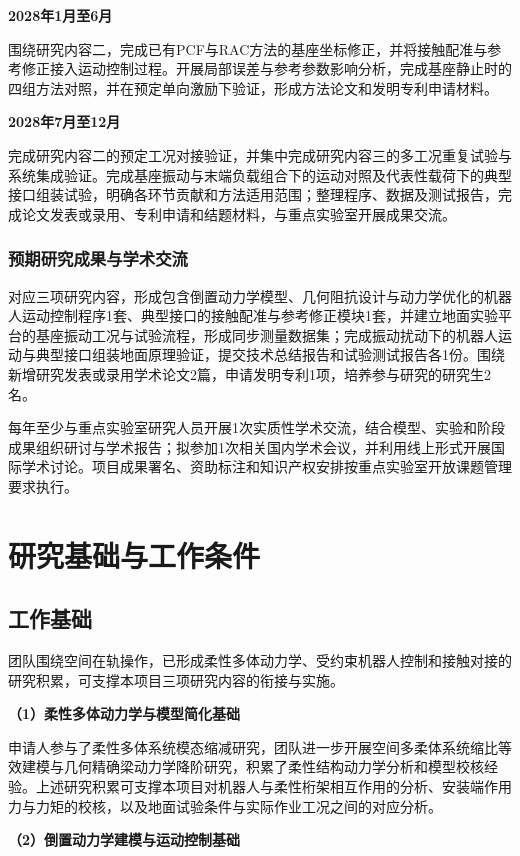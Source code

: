 \documentclass[UTF8,a4paper,zihao=-4,fontset=fandol]{ctexart}
\newcommand{\topic}[1]{\par\addvspace{0.5em}\noindent\textbf{#1}\par\nobreak}
\begin{document}
\topic{2028年1月至6月}
围绕研究内容二，完成已有PCF与RAC方法的基座坐标修正，并将接触配准与参考修正接入运动控制过程。开展局部误差与参考参数影响分析，完成基座静止时的四组方法对照，并在预定单向激励下验证，形成方法论文和发明专利申请材料。

\topic{2028年7月至12月}
完成研究内容二的预定工况对接验证，并集中完成研究内容三的多工况重复试验与系统集成验证。完成基座振动与末端负载组合下的运动对照及代表性载荷下的典型接口组装试验，明确各环节贡献和方法适用范围；整理程序、数据及测试报告，完成论文发表或录用、专利申请和结题材料，与重点实验室开展成果交流。

\subsubsection{预期研究成果与学术交流}

对应三项研究内容，形成包含倒置动力学模型、几何阻抗设计与动力学优化的机器人运动控制程序1套、典型接口的接触配准与参考修正模块1套，并建立地面实验平台的基座振动工况与试验流程，形成同步测量数据集；完成振动扰动下的机器人运动与典型接口组装地面原理验证，提交技术总结报告和试验测试报告各1份。围绕新增研究发表或录用学术论文2篇，申请发明专利1项，培养参与研究的研究生2名。

每年至少与重点实验室研究人员开展1次实质性学术交流，结合模型、实验和阶段成果组织研讨与学术报告；拟参加1次相关国内学术会议，并利用线上形式开展国际学术讨论。项目成果署名、资助标注和知识产权安排按重点实验室开放课题管理要求执行。

\section{研究基础与工作条件}

\subsection{工作基础}

团队围绕空间在轨操作，已形成柔性多体动力学、受约束机器人控制和接触对接的研究积累，可支撑本项目三项研究内容的衔接与实施。

\topic{（1）柔性多体动力学与模型简化基础}

申请人参与了柔性多体系统模态缩减研究\cite{sonneville2021}，团队进一步开展空间多柔体系统缩比等效建模\cite{qi2025}与几何精确梁动力学降阶研究，积累了柔性结构动力学分析和模型校核经验。上述研究积累可支撑本项目对机器人与柔性桁架相互作用的分析、安装端作用力与力矩的校核，以及地面试验条件与实际作业工况之间的对应分析。

\topic{（2）倒置动力学建模与运动控制基础}
\end{document}
